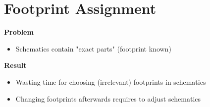 \section{Footprint Assignment}

\begin{frame}{\secname}
  \textbf{Problem}
  \begin{itemize}
    \item Schematics contain "exact parts" (footprint known)
  \end{itemize}

  \pause

  \textbf{Result}
  \begin{itemize}
    \item Wasting time for choosing (irrelevant) footprints in schematics
    \item Changing footprints afterwards requires to adjust schematics
  \end{itemize}
\end{frame}

